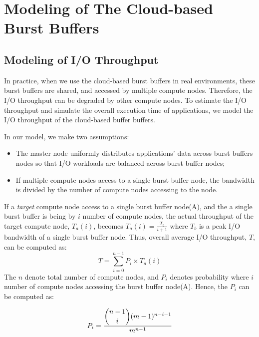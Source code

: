 \section{Modeling of The Cloud-based Burst Buffers}
\label{sec:modeling}
\subsection{Modeling of I/O Throughput}
In practice, when we use the cloud-based burst buffers in real environments,
these burst buffers are shared, and accessed by multiple compute nodes.
Therefore, the I/O throughput can be degraded by other compute nodes.
To estimate the I/O throughput and simulate the overall execution
time of applications, we model the I/O throughput of the cloud-based buffer
buffers.

In our model, we make two assumptions: 
\begin{itemize}
  \item The master node uniformly distributes applications' data across burst
  buffers nodes so that I/O workloads are balanced across
  burst buffer nodes;
  \item If multiple compute nodes access to a single burst buffer node, the
  bandwidth is divided by the number of compute nodes accessing to the node.
\end{itemize}
If a \emph{target} compute node access to a single burst buffer node(A), and the  
a single burst buffer is being by $i$ number of compute nodes, the actual
throughput of the target compute node, $T_{a}(i)$, becomes
$T_{a}(i)=\frac{T_{b}}{i+1}$ where $T_{b}$ is a peak I/O bandwidth of a single
burst buffer node. Thus, overall average I/O throughput, $T$, can be computed as:
\begin{equation}
T=\sum_{i=0}^{n-1} P_{i} \times T_{a}(i)\label{model:throughput}
\end{equation}
The $n$ denote total number of compute nodes, and $P_{i}$ denotes probability
where $i$ number of compute nodes accessing the burst buffer node(A). 
Hence, the $P_{i}$ can be computed as:


\begin{equation}
P_i=\frac{\dbinom{n-1}{i}(m-1)^{n-i-1}}{m^{n-1}}
\end{equation}

